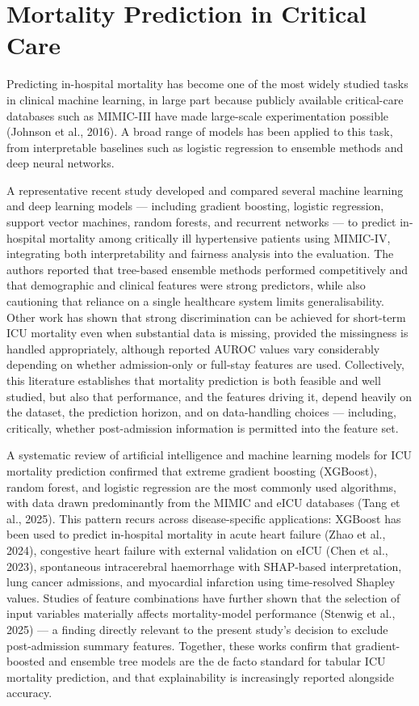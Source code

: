 \documentclass[12pt,a4paper]{report}
\begin{document}
\section{Mortality Prediction in Critical Care}
Predicting in-hospital mortality has become one of the most widely studied tasks in clinical machine learning, in large part because publicly available critical-care databases such as MIMIC-III have made large-scale experimentation possible (Johnson et al., 2016). A broad range of models has been applied to this task, from interpretable baselines such as logistic regression to ensemble methods and deep neural networks.

A representative recent study developed and compared several machine learning and deep learning models --- including gradient boosting, logistic regression, support vector machines, random forests, and recurrent networks --- to predict in-hospital mortality among critically ill hypertensive patients using MIMIC-IV, integrating both interpretability and fairness analysis into the evaluation. The authors reported that tree-based ensemble methods performed competitively and that demographic and clinical features were strong predictors, while also cautioning that reliance on a single healthcare system limits generalisability. Other work has shown that strong discrimination can be achieved for short-term ICU mortality even when substantial data is missing, provided the missingness is handled appropriately, although reported AUROC values vary considerably depending on whether admission-only or full-stay features are used. Collectively, this literature establishes that mortality prediction is both feasible and well studied, but also that performance, and the features driving it, depend heavily on the dataset, the prediction horizon, and on data-handling choices --- including, critically, whether post-admission information is permitted into the feature set.

A systematic review of artificial intelligence and machine learning models for ICU mortality prediction confirmed that extreme gradient boosting (XGBoost), random forest, and logistic regression are the most commonly used algorithms, with data drawn predominantly from the MIMIC and eICU databases (Tang et al., 2025). This pattern recurs across disease-specific applications: XGBoost has been used to predict in-hospital mortality in acute heart failure (Zhao et al., 2024), congestive heart failure with external validation on eICU (Chen et al., 2023), spontaneous intracerebral haemorrhage with SHAP-based interpretation, lung cancer admissions, and myocardial infarction using time-resolved Shapley values. Studies of feature combinations have further shown that the selection of input variables materially affects mortality-model performance (Stenwig et al., 2025) --- a finding directly relevant to the present study's decision to exclude post-admission summary features. Together, these works confirm that gradient-boosted and ensemble tree models are the de facto standard for tabular ICU mortality prediction, and that explainability is increasingly reported alongside accuracy.
\end{document}
